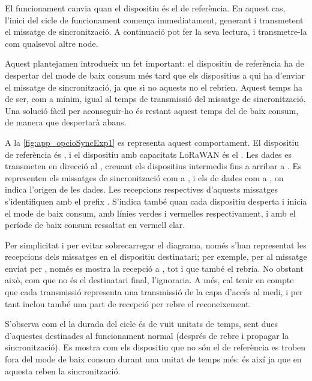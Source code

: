 \documentclass{tfgitic}[2024/07/01]
\begin{document}
{El funcionament canvia quan el dispositiu és el de referència. En aquest cas, l'inici del cicle de funcionament comença immediatament, generant i transmetent el missatge de sincronització. A continuació pot fer la seva lectura, i transmetre-la com qualsevol altre node.

Aquest plantejamen introdueix un fet important: el dispositiu de referència ha de despertar del mode de baix consum més tard que els dispositius a qui ha d'enviar el missatge de sincronització, ja que si no aquests no el rebrien. Aquest temps ha de ser, com a mínim, igual al temps de transmissió del missatge de sincronització. Una solució fàcil per aconseguir-ho és restant aquest temps del de baix consum, de manera que despertarà abans. 

A la \autoref{fig:app_opcioSyncExp1} es representa aquest comportament. El dispositiu de referència és , i el dispositiu amb capacitats LoRaWAN és el . Les dades es transmeten en direcció al , creuant els dispositius intermedis fins a arribar a . Es representen els missatges de sincronització com a , i els de dades com a , on  indica l'origen de les dades. Les recepcions respectives d'aquests missatges s'identifiquen amb el prefix . S'indica també quan cada dispositiu desperta i inicia el mode de baix consum, amb línies verdes i vermelles respectivament, i amb el període de baix consum ressaltat en vermell clar. 

Per simplicitat i per evitar sobrecarregar el diagrama, només s'han representat les recepcions dels missatges en el dispositiu destinatari; per exemple, per al missatge  enviat per , només es mostra la recepció a , tot i que  també el rebria. No obstant això, com que no és el destinatari final, l'ignoraria. A més, cal tenir en compte que cada transmissió representa una transmissió de la capa d'accés al medi, i per tant inclou també una part de recepció per rebre el reconeixement.

S'observa com el la durada del cicle és de vuit unitats de temps, sent dues d'aquestes destinades al funcionament normal (després de rebre i propagar la sincronització). Es mostra com els dispositiu que no són el de referència es troben fora del mode de baix consum durant una unitat de temps més: és així ja que en aquesta reben la sincronització.


}
\end{document}
